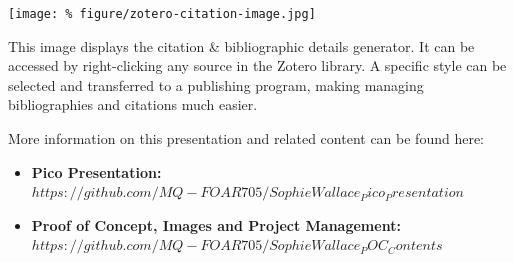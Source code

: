 \documentclass[unknownkeysallowed,usepdftitle=false, parskip=full]{beamer}
\newcommand{\secvariable}{nothing}
\newcommand{\mysection}[1]{\renewcommand{\secvariable}{#1}
}
\begin{document}
\mysection{minor}
\begin{frame}\label{\secvariable} %
\begin{center}
\texttt{[image: \%
figure/zotero-citation-image.jpg]}
\end{center}
\vspace{-0.2cm}

%
This image displays the citation & bibliographic details generator. It can be accessed by right-clicking any source in the Zotero library. A specific style can be selected and transferred to a publishing program, making managing bibliographies and citations much easier.


\end{frame}

\mysection{conclusion}
\begin{frame}\label{\secvariable}

  More information on this presentation and related content can be found here:
    \begin{itemize}
   \item  \textbf{Pico Presentation:} 
   $https://github.com/MQ-FOAR705/SophieWallace_Pico_Presentation$
  \item \textbf{Proof of Concept, Images and Project Management:} $https://github.com/MQ-FOAR705/SophieWallace_POC_Contents$
   \end{itemize}

 

\end{frame}
\end{document}
